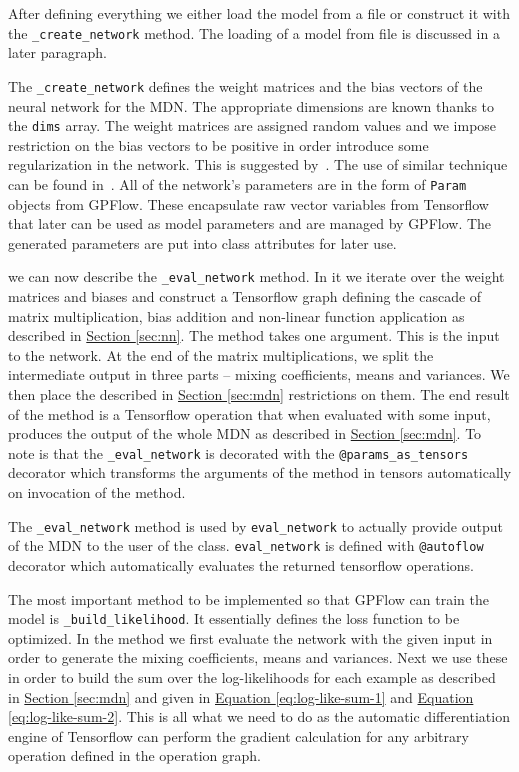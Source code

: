 \documentclass[12pt,a4paper,twoside]{scrartcl}
\numberwithin{equation}{section}
\newcommand{\refsec}[1]{\hyperref[#1]{Section \ref*{#1}}}
\renewcommand*{\refeq}[1]{\hyperref[#1]{Equation \ref*{#1}}}
\begin{document}
After defining everything we either load the model from a file or construct it with the \texttt{\_create\_network} method. The loading of a model from file is discussed in a later paragraph.

The \texttt{\_create\_network} defines the weight matrices and the bias vectors of the neural network for the MDN. The appropriate dimensions are known thanks to the \texttt{dims} array. The weight matrices are assigned random values and we impose restriction on the bias vectors to be positive in order introduce some regularization in the network. This is suggested by~\cite{mdntut}. The use of similar technique can be found in~\cite{chorowski2015}. All of the network's parameters are in the form of \texttt{Param} objects from GPFlow. These encapsulate raw vector variables from Tensorflow that later can be used as model parameters and are managed by GPFlow. The generated parameters are put into class attributes for later use.

we can now describe the \texttt{\_eval\_network} method. In it we iterate over the weight matrices and biases and construct a Tensorflow graph defining the cascade of matrix multiplication, bias addition and non-linear function application as described in \refsec{sec:nn}. The method takes one argument. This is the input to the network. At the end of the matrix multiplications, we split the intermediate output in three parts -- mixing coefficients, means and variances. We then place the described in \refsec{sec:mdn} restrictions on them. The end result of the method is a Tensorflow operation that when evaluated with some input, produces the output of the whole MDN as described in \refsec{sec:mdn}. To note is that the \texttt{\_eval\_network} is decorated with the \texttt{@params\_as\_tensors} decorator which transforms the arguments of the method in tensors automatically on invocation of the method.

The \texttt{\_eval\_network} method is used by \texttt{eval\_network} to actually provide output of the MDN to the user of the class. \texttt{eval\_network} is defined with \texttt{@autoflow} decorator which automatically evaluates the returned tensorflow operations.

The most important method to be implemented so that GPFlow can train the model is \texttt{\_build\_likelihood}. It essentially defines the loss function to be optimized. In the method we first evaluate the network with the given input in order to generate the mixing coefficients, means and variances. Next we use these in order to build the sum over the log-likelihoods for each example as described in \refsec{sec:mdn} and given in \refeq{eq:log-like-sum-1} and \refeq{eq:log-like-sum-2}. This is all what we need to do as the automatic differentiation engine of Tensorflow can perform the gradient calculation for any arbitrary operation defined in the operation graph. 
\end{document}
